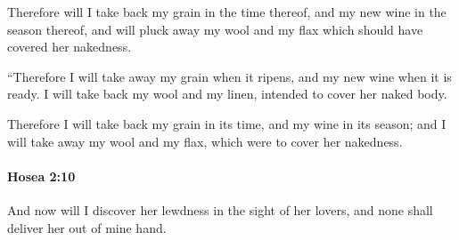 			\begin{versebox}
					\item[BHS] 
					\item[LXX] 
					\item[ASV] Therefore will I take back my grain in the time thereof, and my new wine in the season thereof, and will pluck away my wool and my flax which should have covered her nakedness.
					\item[NIV] “Therefore I will take away my grain when it ripens, and my new wine when it is ready. I will take back my wool and my linen, intended to cover her naked body.
					\item[NRSV] Therefore I will take back my grain in its time, and my wine in its season; and I will take away my wool and my flax, which were to cover her nakedness.
			\end{versebox}

		\paragraph{Hosea 2:10} %
			\label{HOSEA-2-10}

			And now will I discover her lewdness in the sight of her lovers, and none shall deliver her out of mine hand.

